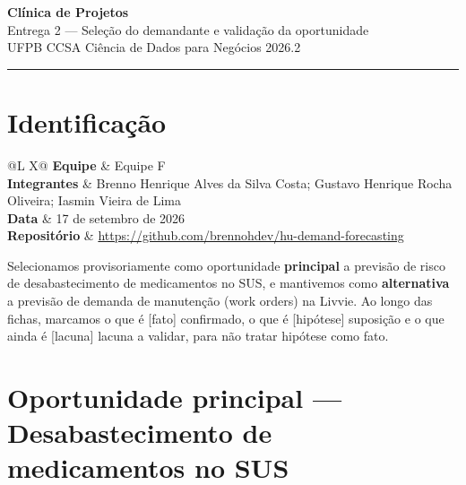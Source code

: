\documentclass[11pt,a4paper]{article}
\newcommand{\campo}[2]{\textbf{#1} & #2 \\ \addlinespace[1pt]}
\newcommand{\fato}{\textcolor{azulmls}{\footnotesize[fato]}}
\newcommand{\hip}{\textcolor{cinzatexto}{\footnotesize[hipótese]}}
\newcommand{\lac}{\textcolor{cinzatexto}{\footnotesize[lacuna]}}
\begin{document}
\begin{center}
    {\LARGE\bfseries\color{azulmls} Clínica de Projetos}\\[3pt]
    {\large Entrega 2 --- Seleção do demandante e validação da oportunidade}\\[2pt]
    {\normalsize UFPB \textperiodcentered{} CCSA \textperiodcentered{} Ciência de Dados para Negócios \textperiodcentered{} 2026.2}
\end{center}

\vspace{4pt}
\hrule
\vspace{6pt}

\section{Identificação}

\begin{tabularx}{\textwidth}{@{}L X@{}}
\campo{Equipe}{Equipe F}
\campo{Integrantes}{Brenno Henrique Alves da Silva Costa; Gustavo Henrique Rocha Oliveira; Iasmin Vieira de Lima}
\campo{Data}{17 de setembro de 2026}
\campo{Repositório}{\url{https://github.com/brennohdev/hu-demand-forecasting}}
\end{tabularx}

Selecionamos provisoriamente como oportunidade \textbf{principal} a previsão de risco de desabastecimento de medicamentos no SUS, e mantivemos como \textbf{alternativa} a previsão de demanda de manutenção (work orders) na Livvie. Ao longo das fichas, marcamos o que é \fato{} confirmado, o que é \hip{} suposição e o que ainda é \lac{} lacuna a validar, para não tratar hipótese como fato.

\section{Oportunidade principal --- Desabastecimento de medicamentos no SUS}
\end{document}
